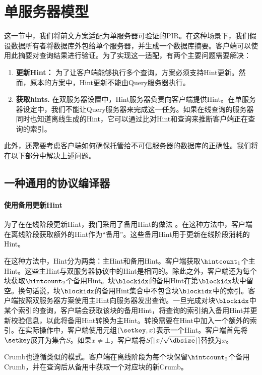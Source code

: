 \section{单服务器模型}
这一节中，我们将前文方案适配为单服务器可验证的PIR。在这种场景下，我们假设数据所有者将数据库外包给单个服务器，并生成一个数据库摘要。客户端可以使用此摘要对查询结果进行验证。为了实现这一适配，有两个主要问题需要解决：
\begin{enumerate}
    \item \textbf{更新Hint：} 为了让客户端能够执行多个查询，方案必须支持Hint更新。然而，原本的方案中，Hint更新不能由Query服务器执行。
    \item \textbf{获取hints.} 在双服务器设置中，Hint服务器负责向客户端提供Hint。在单服务器设定中，我们不能让Query服务器来完成这一任务。如果在线查询的服务器同时也知道离线生成的Hint，它可以通过比对Hint和查询来推断客户端正在查询的索引。
\end{enumerate}

此外，还需要考虑客户端如何确保托管给不可信服务器的数据库的正确性。我们将在以下部分中解决上述问题。

\subsection{一种通用的协议编译器}

\paragraph{使用备用更新Hint}
为了在在线阶段更新Hint，我们采用了备用Hint的做法 \cite{EC:CorHenKog22}。在这种方法中，客户端在离线阶段获取额外的Hint作为“备用”。这些备用Hint用于更新在线阶段消耗的Hint。

在这种方法中，Hint分为两类：主Hint和备用Hint。客户端获取$\hintcount_1$个主Hint。这些主Hint与双服务器协议中的Hint是相同的。除此之外，客户端还为每个块获取$\hintcount_2$个备用Hint。块$\blockidx$的备用Hint在第$\blockidx$块中留空。换句话说，块$\blockidx$的备用Hint集合中不包含块$\blockidx$中的索引。客户端按照双服务器方案使用主Hint向服务器发出查询。一旦完成对块$\blockidx$中某个索引的查询，客户端会获取该块的备用Hint，将查询的索引纳入备用Hint并更新校验信息，以此将备用Hint转换为主Hint。转换需要在Hint中加入一个额外的索引。在实际操作中，客户端使用元组$(\setkey, x)$表示一个Hint。客户端首先将$\setkey$展开为集合$S$。如果$x\neq \bot$，客户端将$S[\lfloor x/\sqrt{\dbsize}\rfloor]$替换为$x$。

Crumb也遵循类似的模式。客户端在离线阶段为每个块保留$\hintcount_2$个备用Crumb，并在查询后从备用中获取一个对应块的新Crumb。

